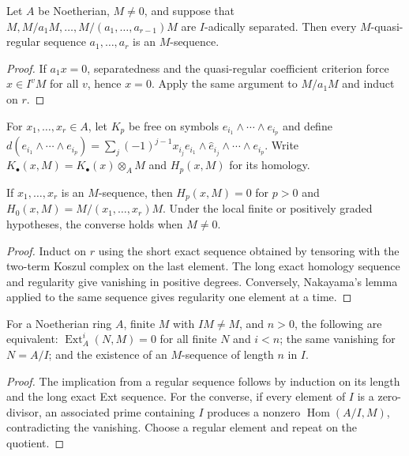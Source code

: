 \begin{theorem}\label{mcrt-thm-16-3}
Let $A$ be Noetherian, $M\ne0$, and suppose that $M,M/a_1M,\ldots,
M/(a_1,\ldots,a_{r-1})M$ are $I$-adically separated.  Then every
$M$-quasi-regular sequence $a_1,\ldots,a_r$ is an $M$-sequence.
\end{theorem}
\begin{proof}
If $a_1x=0$, separatedness and the quasi-regular coefficient criterion force
$x\in I^vM$ for all $v$, hence $x=0$.  Apply the same argument to
$M/a_1M$ and induct on $r$.
\end{proof}

\begin{definition}\label{mcrt-def-koszul}\uses{}
For $x_1,\ldots,x_r\in A$, let $K_p$ be free on symbols
$e_{i_1}\wedge\cdots\wedge e_{i_p}$ and define
$d(e_{i_1}\wedge\cdots\wedge e_{i_p})=\sum_j(-1)^{j-1}x_{i_j}
e_{i_1}\wedge\widehat e_{i_j}\wedge\cdots\wedge e_{i_p}$.  Write
$K_\bullet(x,M)=K_\bullet(x)\otimes_A M$ and $H_p(x,M)$ for its homology.
\end{definition}

\begin{theorem}\label{mcrt-thm-16-5}
If $x_1,\ldots,x_r$ is an $M$-sequence, then $H_p(x,M)=0$ for $p>0$ and
$H_0(x,M)=M/(x_1,\ldots,x_r)M$.  Under the local finite or positively graded
hypotheses, the converse holds when $M\ne0$.
\end{theorem}
\begin{proof}
Induct on $r$ using the short exact sequence obtained by tensoring with the
two-term Koszul complex on the last element.  The long exact homology sequence
and regularity give vanishing in positive degrees.  Conversely, Nakayama's
lemma applied to the same sequence gives regularity one element at a time.
\end{proof}

\begin{theorem}\label{mcrt-thm-16-6}
For a Noetherian ring $A$, finite $M$ with $IM\ne M$, and $n>0$, the following
are equivalent: $\operatorname{Ext}^i_A(N,M)=0$ for all finite $N$ and $i<n$;
the same vanishing for $N=A/I$; and the existence of an $M$-sequence of length
$n$ in $I$.
\end{theorem}
\begin{proof}
The implication from a regular sequence follows by induction on its length and
the long exact Ext sequence.  For the converse, if every element of $I$ is a
zero-divisor, an associated prime containing $I$ produces a nonzero
$\operatorname{Hom}(A/I,M)$, contradicting the vanishing.  Choose a regular
element and repeat on the quotient.
\end{proof}

